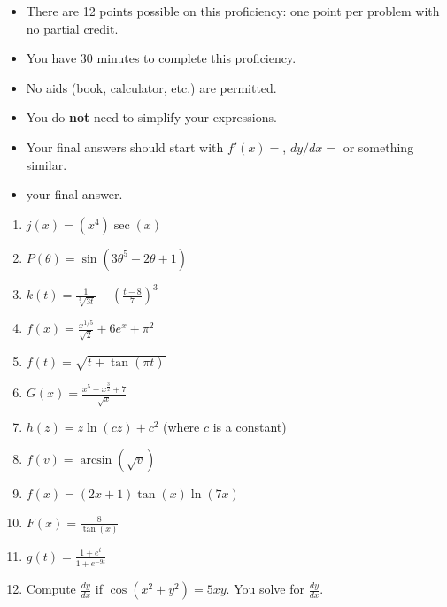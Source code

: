 \documentclass[12pt]{article}
\newcommand{\ds}{\displaystyle}
\begin{document}
\begin{itemize}
\item 
There are 12 points possible on this proficiency: one point per problem with
no partial credit. 

\item You have 30 minutes to complete this proficiency.

\item No aids (book, calculator, etc.) are permitted.  

\item You do \textbf{not} need to simplify your expressions.

\item Your final answers should start with $f'(x)=$, $dy/dx=$ or
something similar.

\item {} your final  answer.
\end{itemize}

\begin{enumerate}
\item $\ds j(x) = \left(x^{4}\right) \sec(x)$\vfill
\item $\ds P(\theta) = \sin(3\theta^{5} - 2\theta+1)$ \vfill
\item $\ds  k(t) = \frac{1}{\sqrt[3]{3t}} + \left( \frac{t-8}{7} \right)^{3}$ \vfill

\newpage
\item $\ds f(x) = \frac{x^{1/5}}{\sqrt{2}} + 6e^{x} + \pi^2$\vfill
\item $\ds f(t) = \sqrt{t+\tan(\pi t)}$\vfill
\item $\ds G(x) = \frac{x^{5} - x^{\frac{3}{2}} + 7}{\sqrt{x}}$ \vfill

\newpage
\item $\ds h(z) = z \ln(cz) + c^{2}$ (where $c$ is a constant) \vfill
\item $\ds f(v) =  \arcsin(\sqrt{v})$ \vfill
\item $\ds f(x) = (2x+1)\tan(x) \ln(7x)$ \vfill

\newpage
\item $\ds F(x) = \frac{8}{\tan(x)}$ \vfill
\item $\ds g(t) = \frac{1+e^{t}}{1+e^{-9t}}$ \vfill
\item Compute $\frac{dy}{dx}$ if $\cos(x^{2}+ y^{2}) = 5xy$. You  solve for $\frac{dy}{dx}$.
\vspace{3.5in}


\end{enumerate}
\end{document}
